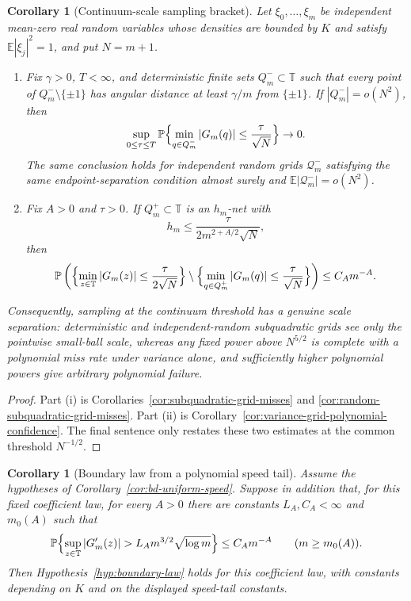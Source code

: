\documentclass[11pt]{amsart}
\numberwithin{equation}{section}
\newtheorem{corollary}[theorem]{Corollary}
\theoremstyle{definition}
\theoremstyle{remark}
\newcommand{\T}{\mathbb T}
\newcommand{\Prob}{\mathbb P}
\newcommand{\Exp}{\mathbb E}
\newcommand{\abs}[1]{\left\lvert #1\right\rvert}
\begin{document}
\begin{corollary}[Continuum-scale sampling bracket]
\label{cor:grid-sampling-bracket}
Let \(\xi_0,\ldots,\xi_m\) be independent mean-zero real random variables whose
densities are bounded by \(K\) and satisfy \(\Exp|\xi_j|^2=1\), and put
\(N=m+1\).
\begin{enumerate}[label=\textup{(\roman*)}]
\item Fix \(\gamma>0\), \(T<\infty\), and deterministic finite sets
\(Q_m^-\subset\T\) such that every point of \(Q_m^-\setminus\{\pm1\}\) has
angular distance at least \(\gamma/m\) from \(\{\pm1\}\).  If
\(|Q_m^-|=o(N^2)\), then
\[
  \sup_{0\le\tau\le T}
  \Prob\Bigl\{\min_{q\in Q_m^-}\abs{G_m(q)}
      \le \frac{\tau}{\sqrt N}\Bigr\}\to0 .
\]
The same conclusion holds for independent random grids \(\mathcal Q_m^-\)
satisfying the same endpoint-separation condition almost surely and
\(\Exp|\mathcal Q_m^-|=o(N^2)\).
\item Fix \(A>0\) and \(\tau>0\).  If \(Q_m^+\subset\T\) is an \(h_m\)-net with
\[
  h_m\le \frac{\tau}{2m^{2+A/2}\sqrt N},
\]
then
\[
  \Prob\left(
    \Bigl\{\min_{z\in\T}\abs{G_m(z)}\le \frac{\tau}{2\sqrt N}\Bigr\}
    \setminus
    \Bigl\{\min_{q\in Q_m^+}\abs{G_m(q)}\le \frac{\tau}{\sqrt N}\Bigr\}
  \right)
  \le C_A m^{-A}.
\]
\end{enumerate}
Consequently, sampling at the continuum threshold has a genuine scale
separation: deterministic and independent-random subquadratic grids see only
the pointwise small-ball scale,
whereas any fixed power above \(N^{5/2}\) is complete with a polynomial miss
rate under variance alone, and sufficiently higher polynomial powers give
arbitrary polynomial failure.
\end{corollary}

\begin{proof}
Part (i) is Corollaries~\ref{cor:subquadratic-grid-misses} and
\ref{cor:random-subquadratic-grid-misses}.  Part (ii) is
Corollary~\ref{cor:variance-grid-polynomial-confidence}.  The final sentence
only restates these two estimates at the common threshold \(N^{-1/2}\).
\end{proof}

\begin{corollary}[Boundary law from a polynomial speed tail]
\label{cor:bd-speedtail-to-boundary}
Assume the hypotheses of Corollary~\ref{cor:bd-uniform-speed}.  Suppose in
addition that, for this fixed coefficient law, for every \(A>0\) there are
constants \(L_A,C_A<\infty\) and \(m_0(A)\) such that
\[
  \Prob\Bigl\{\sup_{z\in\T}\abs{G_m'(z)}>L_A m^{3/2}\sqrt{\log m}\Bigr\}
  \le C_A m^{-A}
  \qquad(m\ge m_0(A)).
\]
Then Hypothesis~\ref{hyp:boundary-law} holds for this coefficient law, with
constants depending on \(K\) and on the displayed speed-tail constants.
\end{corollary}
\end{document}
